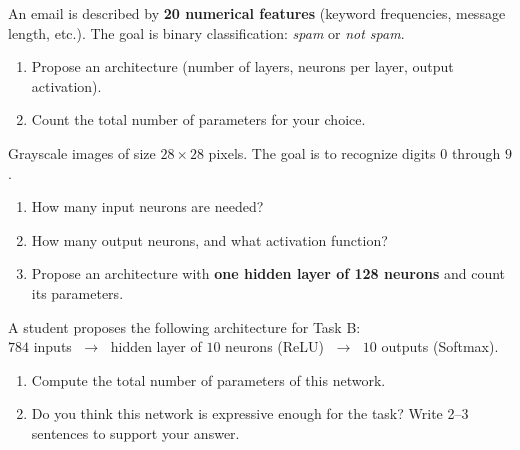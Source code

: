 \documentclass[11pt, a4paper]{article}
\begin{document}
\begin{tcolorbox}[exercisebox, title={Task A — Spam Detection}]
An email is described by \textbf{20 numerical features} (keyword frequencies, message length, etc.).
The goal is binary classification: \emph{spam} or \emph{not spam}.

\begin{enumerate}[label=\textbf{\alph*.}, leftmargin=*, itemsep=0.5em]
  \item Propose an architecture (number of layers, neurons per layer, output activation).
  \item Count the total number of parameters for your choice.
\end{enumerate}

\vspace{4cm}
\end{tcolorbox}

\vspace{0.8em}

\begin{tcolorbox}[exercisebox, title={Task B — Handwritten Digit Recognition}]
Grayscale images of size $28 \times 28$ pixels. The goal is to recognize digits $0$ through $9$.

\begin{enumerate}[label=\textbf{\alph*.}, leftmargin=*, itemsep=0.5em]
  \item How many input neurons are needed?
  \item How many output neurons, and what activation function?
  \item Propose an architecture with \textbf{one hidden layer of 128 neurons} and count its parameters.
\end{enumerate}

\vspace{4cm}
\end{tcolorbox}

\vspace{0.8em}

\begin{tcolorbox}[exercisebox, title={Task C — Open Question}]
A student proposes the following architecture for Task B:\\[4pt]
\quad $784$ inputs $\;\to\;$ hidden layer of $10$ neurons (ReLU) $\;\to\;$ $10$ outputs (Softmax).

\begin{enumerate}[label=\textbf{\alph*.}, leftmargin=*, itemsep=0.5em]
  \item Compute the total number of parameters of this network.
  \item Do you think this network is expressive enough for the task?
  Write 2--3 sentences to support your answer.
\end{enumerate}

\vspace{4cm}
\end{tcolorbox}
\end{document}

